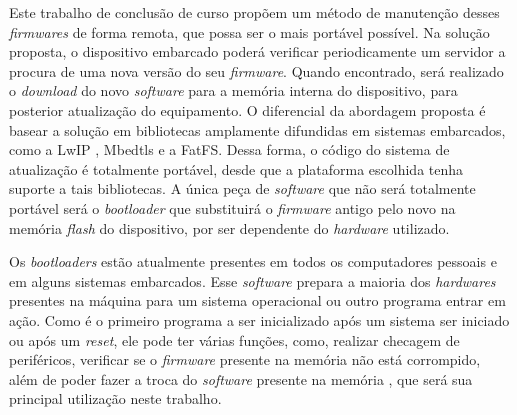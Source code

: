 
Este trabalho de conclusão de curso propõem um método de manutenção desses \textit{firmwares} de forma remota, que possa ser o mais portável possível.
Na solução proposta, o dispositivo embarcado poderá verificar periodicamente um servidor a procura de uma nova versão do seu \textit{firmware}. Quando encontrado, será realizado o \textit{download} do novo \textit{software} para a memória interna do dispositivo, para posterior atualização do equipamento. O diferencial da abordagem proposta é basear a solução em bibliotecas amplamente difundidas em sistemas embarcados, como a LwIP \cite{LWIP}, Mbedtls \cite{mbedtls} e a FatFS\cite{FATFS}. Dessa forma, o código do sistema de atualização é totalmente portável, desde que a plataforma escolhida tenha suporte a tais bibliotecas. A única peça de \textit{software} que não será totalmente portável será o \textit{bootloader} que substituirá o \textit{firmware} antigo pelo novo na memória \textit{flash} do dispositivo, por ser dependente do \textit{hardware} utilizado.

 

Os \textit{bootloaders} estão atualmente presentes em todos os computadores pessoais e em alguns sistemas embarcados. Esse \textit{software} prepara a maioria dos \textit{hardwares} presentes na máquina para um sistema operacional ou outro programa entrar em ação.
Como é o primeiro programa a ser inicializado após um sistema ser iniciado ou após um \textit{reset}, ele pode ter várias funções, como, realizar checagem de periféricos, verificar se o \textit{firmware} presente na memória não está corrompido, além de poder fazer a troca do \textit{software} presente na memória \cite{DavesDurlin2013}, que será sua principal utilização neste trabalho.

